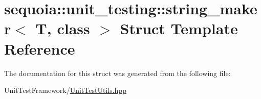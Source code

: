 \hypertarget{structsequoia_1_1unit__testing_1_1string__maker}{}\section{sequoia\+::unit\+\_\+testing\+::string\+\_\+maker$<$ T, class $>$ Struct Template Reference}
\label{structsequoia_1_1unit__testing_1_1string__maker}


The documentation for this struct was generated from the following file\+:\begin{DoxyCompactItemize}
\item 
Unit\+Test\+Framework/\mbox{\hyperlink{_unit_test_utils_8hpp}{Unit\+Test\+Utils.\+hpp}}\end{DoxyCompactItemize}
